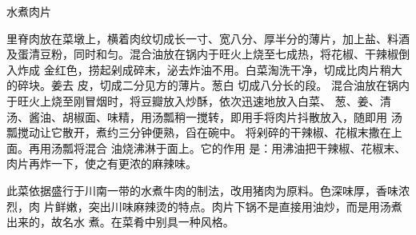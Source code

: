 \begin{recipe}{水煮肉片}

\ingredients


\cooking

\step 里脊肉放在菜墩上，横着肉纹切成长一寸、宽八分、厚半分的薄片，加上盐、料酒
及蛋清豆粉，同时和匀。混合油放在锅内于旺火上烧至七成热，将花椒、干辣椒倒入炸成
 金红色，捞起剁成碎末，泌去炸油不用。白菜淘洗干净，切成比肉片稍大的碎块。姜去
皮，切成二分见方的薄片。葱白 切成八分长的段。
\step 混合油放在锅内于旺火上烧至刚冒烟时，将豆瓣放入炒酥，依次迅速地放入白菜、
葱、姜、清汤、酱油、胡椒面、味精，用汤瓢稍一搅转，即用手将肉片抖散放入，随即用
汤瓢搅动让它散开，煮约三分钟便熟，舀在碗中。
\step 将剁碎的干辣椒、花椒末撒在上面。再用汤瓢将混合 油烧沸淋于面上。它的作用
是：用沸油把干辣椒、花椒末、肉片再炸一下，使之有更浓的麻辣味。

\notes

此菜依据盛行于川南一带的水煮牛肉的制法，改用猪肉为原料。色深味厚，香味浓烈，肉
片鲜嫩，突出川味麻辣烫的特点。肉片下锅不是直接用油炒，而是用汤煮出来的，故名水
煮。在菜肴中别具一种风格。

\end{recipe}

